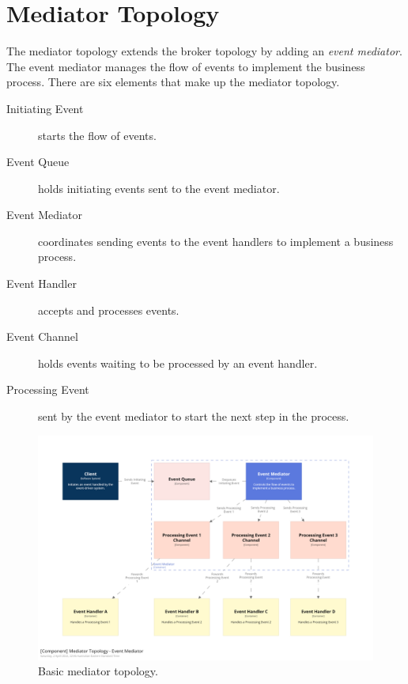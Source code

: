 \section{Mediator Topology}

The mediator topology extends the broker topology by adding an \emph{event mediator}.
The event mediator manages the flow of events to implement the business process.
There are six elements that make up the mediator topology.

\begin{description}
    \item[Initiating Event] starts the flow of events.
    \item[Event Queue] holds initiating events sent to the event mediator.
    \item[Event Mediator] coordinates sending events to the event handlers to implement a business process.
    \item[Event Handler] accepts and processes events.
    \item[Event Channel] holds events waiting to be processed by an event handler.
    \item[Processing Event] sent by the event mediator to start the next step in the process.
\end{description}

\begin{figure}[h!]
    \begin{adjustwidth}{-10mm}{-10mm}
        \centering
        \includegraphics[trim=195 195 195 195,clip,width=0.97\paperwidth]{diagrams/mediator-components.png}
    \end{adjustwidth}
    \caption{Basic mediator topology.}
    \label{fig:mediator-components}
\end{figure}

